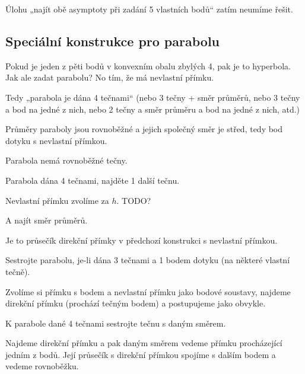 \documentclass[12pt]{article}					%
\begin{document}
\begin{poznamka}
	Úlohu „najít obě asymptoty při zadání 5 vlastních bodů“ zatím neumíme řešit.
\end{poznamka}

\subsection{Speciální konstrukce pro parabolu}
\begin{poznamka}
	Pokud je jeden z pěti bodů v konvexním obalu zbylých 4, pak je to hyperbola. Jak ale zadat parabolu? No tím, že má nevlastní přímku.

	Tedy „parabola je dána 4 tečnami“ (nebo 3 tečny + směr průměrů, nebo 3 tečny a bod na jedné z nich, nebo 2 tečny a směr průměru a bod na jedné z nich, atd.)
\end{poznamka}

\begin{poznamka}[Připomenutí]
	Průměry paraboly jsou rovnoběžné a jejich společný směr je střed, tedy bod dotyku s nevlastní přímkou.

	Parabola nemá rovnoběžné tečny.
\end{poznamka}

\begin{priklad}
	Parabola dána 4 tečnami, najděte 1 další tečnu.

	\begin{reseni}
		Nevlastní přímku zvolíme za $h$. TODO?
	\end{reseni}

	A najít směr průměrů.

	\begin{reseni}
		Je to průsečík direkční přímky v předchozí konstrukci s nevlastní přímkou.
	\end{reseni}
\end{priklad}


\begin{priklad}
	Sestrojte parabolu, je-li dána 3 tečnami a 1 bodem dotyku (na některé vlastní tečně).

	\begin{reseni}
		Zvolíme si přímku s bodem a nevlastní přímku jako bodové soustavy, najdeme direkční přímku (prochází tečným bodem) a postupujeme jako obvykle.
	\end{reseni}
\end{priklad}

\begin{priklad}
	K parabole dané 4 tečnami sestrojte tečnu s daným směrem.

	\begin{reseni}
		Najdeme direkční přímku a pak daným směrem vedeme přímku procházející jedním z bodů. Její průsečík s direkční přímkou spojíme s dalším bodem a vedeme rovnoběžku.
	\end{reseni}
\end{priklad}
\end{document}
